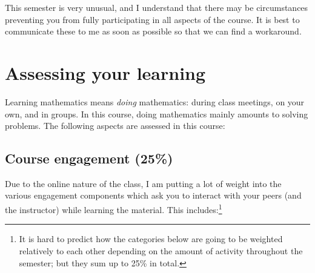 \documentclass[oneside,11pt]{amsart}
\begin{document}
This semester is very unusual, and I understand that there may be circumstances 
preventing you from fully participating in all aspects of the course.
It is best to communicate these to me as soon as possible so that we can 
find a workaround.

\section{Assessing your learning}

Learning mathematics means \emph{doing} mathematics: during class meetings, on your own, and in groups.
In this course, doing mathematics mainly amounts to solving problems.
The following aspects are assessed in this course:

\subsection{Course engagement (25\%)}

Due to the online nature of the class, I am putting a lot of weight
into the various engagement components which ask you to interact with 
your peers (and the instructor) while learning the material. This includes:\footnote{It is 
hard to predict how the categories below are going to be weighted relatively to each other
depending on the amount of activity throughout the semester; but they sum up to 25\% in total.}
\end{document}
